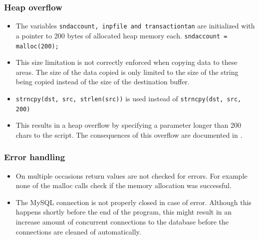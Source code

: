 \subsubsection*{Heap overflow}\label{chapter:re_heap}
\begin{itemize}
	\item The variables \texttt{sndaccount, inpfile and transactiontan}
		are initialized with a pointer to 200 bytes of allocated heap
		memory each. \newline
		\texttt{sndaccount = malloc(200);}
	\item This size limitation is not correctly enforced when copying data to
		these areas. The size of the data copied is only limited to the size of
		the string being copied instead of the size of the destination buffer.
	\item \texttt{strncpy(dst, src, strlen(src))} is used instead of \newline
		\texttt{strncpy(dst, src, 200)}
	\item This results in a heap overflow by specifying a parameter longer than
		200 chars to the script. The consequences of this overflow are
		documented in .
\end{itemize}

\subsubsection*{Error handling}
\begin{itemize}
	\item On multiple occasions return values are not checked for
		errors. For example none of the malloc calls check if the
		memory allocation was successful.
	\item The MySQL connection is not properly closed in case of error.
		Although this happens shortly before the end of the program,
		this might result in an increase amount of concurrent
		connections to the database before the connections are cleaned
		of automatically.
\end{itemize}
